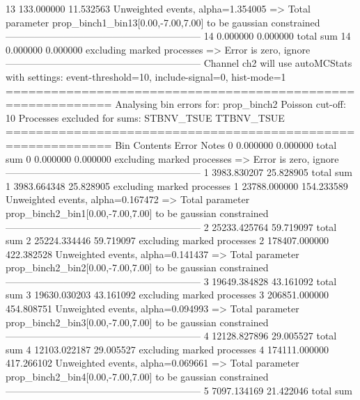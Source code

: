 13         133.000000      11.532563       Unweighted events, alpha=1.354005
  => Total parameter prop_binch1_bin13[0.00,-7.00,7.00] to be gaussian constrained
------------------------------------------------------------
14         0.000000        0.000000        total sum                     
14         0.000000        0.000000        excluding marked processes    
  => Error is zero, ignore      
------------------------------------------------------------
Channel ch2 will use autoMCStats with settings: event-threshold=10, include-signal=0, hist-mode=1
============================================================
Analysing bin errors for: prop_binch2
Poisson cut-off: 10
Processes excluded for sums: STBNV_TSUE TTBNV_TSUE
============================================================
Bin        Contents        Error           Notes                         
0          0.000000        0.000000        total sum                     
0          0.000000        0.000000        excluding marked processes    
  => Error is zero, ignore      
------------------------------------------------------------
1          3983.830207     25.828905       total sum                     
1          3983.664348     25.828905       excluding marked processes    
1          23788.000000    154.233589      Unweighted events, alpha=0.167472
  => Total parameter prop_binch2_bin1[0.00,-7.00,7.00] to be gaussian constrained
------------------------------------------------------------
2          25233.425764    59.719097       total sum                     
2          25224.334446    59.719097       excluding marked processes    
2          178407.000000   422.382528      Unweighted events, alpha=0.141437
  => Total parameter prop_binch2_bin2[0.00,-7.00,7.00] to be gaussian constrained
------------------------------------------------------------
3          19649.384828    43.161092       total sum                     
3          19630.030203    43.161092       excluding marked processes    
3          206851.000000   454.808751      Unweighted events, alpha=0.094993
  => Total parameter prop_binch2_bin3[0.00,-7.00,7.00] to be gaussian constrained
------------------------------------------------------------
4          12128.827896    29.005527       total sum                     
4          12103.022187    29.005527       excluding marked processes    
4          174111.000000   417.266102      Unweighted events, alpha=0.069661
  => Total parameter prop_binch2_bin4[0.00,-7.00,7.00] to be gaussian constrained
------------------------------------------------------------
5          7097.134169     21.422046       total sum                     
